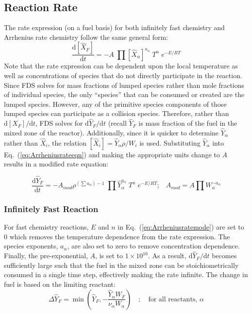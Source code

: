 \subsection{Reaction Rate} 
\label{Reaction_Rate_Model}

The rate expression (on a fuel basis) for both infinitely fast chemistry and Arrhenius rate chemistry follow the same general form:
\begin{equation}\label{eq:Arrheniusrateeqn}
\frac{\mbox{d}[\hat{X}_F]}{\mbox{d}t} = -A \; \prod [\hat{X}_{\alpha}]^{a_{\alpha}} \; T^n \; e^{-E/RT} 
\end{equation}
Note that the rate expression can be dependent upon the local temperature as well as concentrations of species that do not directly participate in the reaction. Since FDS solves for mass fractions of lumped species rather than mole fractions of individual species, the only ``species'' that can be consumed or created are the lumped species.  However, any of the primitive species components of those lumped species can participate as a collision species.  Therefore, rather than $\mbox{d}[X_F]/\mbox{d}t$,  FDS solves for $\mbox{d}\hat{Y}_{F}/\mbox{d}t$ (recall $\hat{Y}_{F}$ is mass fraction of the fuel in the mixed zone of the reactor).  Additionally, since it is quicker to determine $\hat{Y}_{\alpha}$ rather than $\hat{X}_i$, the relation $[\hat{X}_i]=\hat{Y}_{\alpha} \rho/W_i$ is used.  Substituting $\hat{Y}_{\alpha}$ into Eq.~(\ref{eq:Arrheniusrateeqn}) and making the appropriate units change to $A$ results in a modified rate equation:

\begin{equation}\label{eq:Arrheniusratemode}
\frac{\mbox{d}\hat{Y}_{F}}{\mbox{d}t} = -A_{mod} \rho^{(\sum a_{\alpha}) -1} \; \prod \hat{Y}_{\alpha}^{a_{\alpha}} \; T^n \; e^{-E/RT}; \;\;\; A_{mod} = A \prod W_{\alpha}^{-a_{\alpha}}  
\end{equation}

\subsubsection{Infinitely Fast Reaction}
For fast chemistry reactions, $E$ and $n$ in Eq.~(\ref{eq:Arrheniusratemode}) are set to $0$ which removes the temperature dependence from the rate expression. The species exponents, $a_{\alpha}$, are also set to zero to remove concentration dependence. Finally, the pre-exponential, $A$, is set to $1 \times 10^{16}$. As a result, $\mbox{d}\hat{Y}_F/\mbox{d}t$ becomes sufficiently large such that the fuel in the mixed zone can be stoichiometrically consumed in a single time step, effectively making the rate infinite. The change in fuel is based on the limiting reactant: 
\begin{equation}\label{eq:stoich_fuel_single}
\Delta \hat{Y}_{F} = \min \left (\hat{Y}_F,-\frac{\hat{Y}_{\alpha}W_{F}}{\nu_{\alpha} W_{\alpha}}\right) \quad ; \quad \mbox{for all reactants, $\alpha$}
\end{equation}

